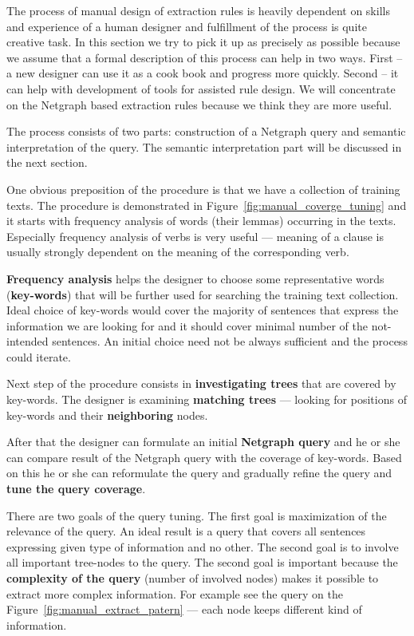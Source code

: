 The process of manual design of extraction rules is heavily dependent on skills and experience of a human designer and fulfillment of the process is quite creative task. In this section we try to pick it up as precisely as possible because we assume that a formal description of this process can help in two ways. First -- a new designer can use it as a cook book and progress more quickly. Second -- it can help with development of tools for assisted rule design. We will concentrate on the Netgraph based extraction rules because we think they are more useful.

The process consists of two parts: construction of a Netgraph query and semantic interpretation of the query. The semantic interpretation part will be discussed in the next section.

One obvious preposition of the procedure is that we have a collection of training texts.
The procedure is demonstrated in Figure~\ref{fig:manual_coverge_tuning} and it starts with frequency analysis of words (their lemmas) occurring in the texts. Especially frequency analysis of verbs is very useful --- meaning of a clause is usually strongly dependent on the meaning of the corresponding verb.

\textbf{Frequency analysis} helps the designer to choose some representative words (\textbf{key-words}) that will be further used for searching the training text collection. Ideal choice of key-words would cover the majority of sentences that express the information we are looking for and it should cover minimal number of the not-intended sentences. An initial choice need not be always sufficient and the process could iterate.

Next step of the procedure consists in \textbf{investigating trees} that are covered by key-words. The designer is examining \textbf{matching trees} --- looking for positions of key-words and their \textbf{neighboring} nodes.

After that the designer can formulate an initial \textbf{Netgraph query} and he or she can compare result of the Netgraph query with the coverage of key-words. Based on this he or she can reformulate the query and gradually refine the query and \textbf{tune the query coverage}.

There are two goals of the query tuning. The first goal is maximization of the relevance of the query. An ideal result is a query that covers all sentences expressing given type of information and no other. The second goal is to involve all important tree-nodes to the query. The second goal is important because the \textbf{complexity of the query} (number of involved nodes) makes it possible to extract more complex information. For example see the query on the Figure~\ref{fig:manual_extract_patern} --- each node keeps different kind of information.


